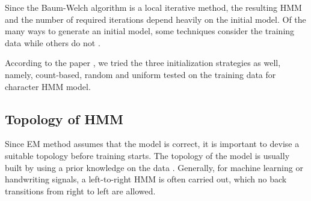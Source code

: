 Since the Baum-Welch algorithm is a local iterative method, the resulting HMM and the number of required iterations depend heavily on the initial model. Of the many ways to generate an initial model, some techniques consider the training data while others do not \cite{Laan}.

According to the paper \cite{Laan}, we tried the three initialization strategies as well, namely, count-based, random and uniform tested on the training data for character HMM model.

\subsection{Topology of HMM}

Since EM method assumes that the model is correct, it is important to devise a suitable topology before training starts. The topology of the model is usually built by using a prior knowledge on the data \cite{Suen}. Generally, for machine learning or handwriting signals, a left-to-right HMM is often carried out, which no back transitions from right to left are allowed.

